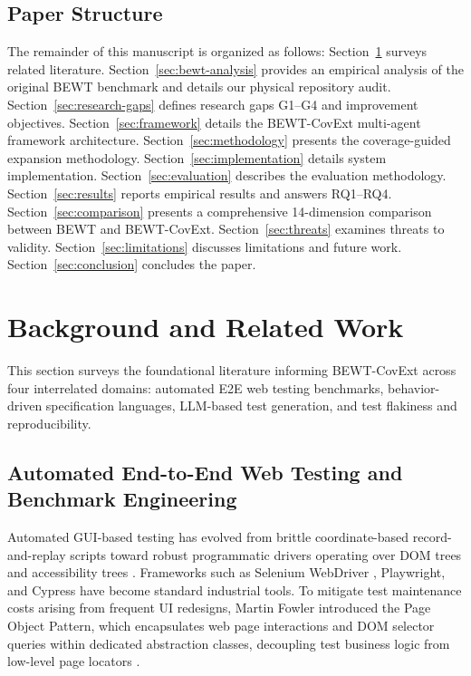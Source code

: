 \documentclass[pdflatex,sn-mathphys-num]{sn-jnl}
\begin{document}
\subsection{Paper Structure}

The remainder of this manuscript is organized as follows: Section~\ref{sec:background} surveys related literature. Section~\ref{sec:bewt-analysis} provides an empirical analysis of the original BEWT benchmark and details our physical repository audit. Section~\ref{sec:research-gaps} defines research gaps G1--G4 and improvement objectives. Section~\ref{sec:framework} details the BEWT-CovExt multi-agent framework architecture. Section~\ref{sec:methodology} presents the coverage-guided expansion methodology. Section~\ref{sec:implementation} details system implementation. Section~\ref{sec:evaluation} describes the evaluation methodology. Section~\ref{sec:results} reports empirical results and answers RQ1--RQ4. Section~\ref{sec:comparison} presents a comprehensive 14-dimension comparison between BEWT and BEWT-CovExt. Section~\ref{sec:threats} examines threats to validity. Section~\ref{sec:limitations} discusses limitations and future work. Section~\ref{sec:conclusion} concludes the paper.


\section{Background and Related Work}\label{sec:background}

This section surveys the foundational literature informing BEWT-CovExt across four interrelated domains: automated E2E web testing benchmarks, behavior-driven specification languages, LLM-based test generation, and test flakiness and reproducibility.

\subsection{Automated End-to-End Web Testing and Benchmark Engineering}

Automated GUI-based testing has evolved from brittle coordinate-based record-and-replay scripts toward robust programmatic drivers operating over DOM trees and accessibility trees \cite{leotta2016evaluating}. Frameworks such as Selenium WebDriver \cite{selenium2024}, Playwright, and Cypress have become standard industrial tools. To mitigate test maintenance costs arising from frequent UI redesigns, Martin Fowler introduced the Page Object Pattern, which encapsulates web page interactions and DOM selector queries within dedicated abstraction classes, decoupling test business logic from low-level page locators \cite{leotta2018repairing}.
\end{document}
